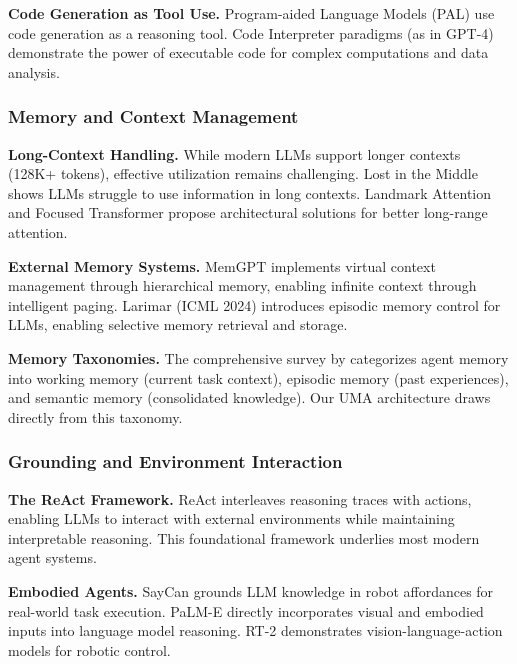 \documentclass{article}
\theoremstyle{plain}
\theoremstyle{definition}
\theoremstyle{remark}
\begin{document}
\textbf{Code Generation as Tool Use.} Program-aided Language Models (PAL) \citep{gao2023pal} use code generation as a reasoning tool. Code Interpreter paradigms (as in GPT-4) demonstrate the power of executable code for complex computations and data analysis.

\subsubsection{Memory and Context Management}

\textbf{Long-Context Handling.} While modern LLMs support longer contexts (128K+ tokens), effective utilization remains challenging. Lost in the Middle \citep{liu2024lost} shows LLMs struggle to use information in long contexts. Landmark Attention \citep{mohtashami2023landmark} and Focused Transformer \citep{tworkowski2023focused} propose architectural solutions for better long-range attention.

\textbf{External Memory Systems.} MemGPT \citep{packer2023memgpt} implements virtual context management through hierarchical memory, enabling infinite context through intelligent paging. Larimar \citep{das2024larimar} (ICML 2024) introduces episodic memory control for LLMs, enabling selective memory retrieval and storage.

\textbf{Memory Taxonomies.} The comprehensive survey by \citet{zhang2025memory} categorizes agent memory into working memory (current task context), episodic memory (past experiences), and semantic memory (consolidated knowledge). Our UMA architecture draws directly from this taxonomy.

\subsubsection{Grounding and Environment Interaction}

\textbf{The ReAct Framework.} ReAct \citep{yao2023react} interleaves reasoning traces with actions, enabling LLMs to interact with external environments while maintaining interpretable reasoning. This foundational framework underlies most modern agent systems.

\textbf{Embodied Agents.} SayCan \citep{ahn2022saycan} grounds LLM knowledge in robot affordances for real-world task execution. PaLM-E \citep{driess2023palme} directly incorporates visual and embodied inputs into language model reasoning. RT-2 \citep{brohan2023rt2} demonstrates vision-language-action models for robotic control.
\end{document}
